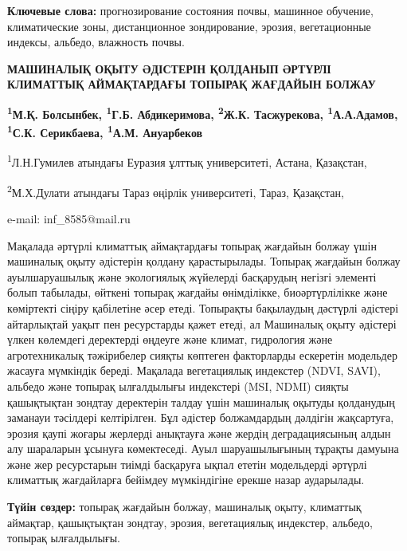 {\bfseries Ключевые слова:} прогнозирование состояния почвы, машинное
обучение, климатические зоны, дистанционное зондирование, эрозия,
вегетационные индексы, альбедо, влажность почвы.

\begin{articleheader}
{\bfseries МАШИНАЛЫҚ ОҚЫТУ ӘДІСТЕРІН ҚОЛДАНЫП ӘРТҮРЛІ КЛИМАТТЫҚ
АЙМАҚТАРДАҒЫ ТОПЫРАҚ ЖАҒДАЙЫН БОЛЖАУ}

{\bfseries
\textsuperscript{1}М.Қ. Болсынбек,
\textsuperscript{1}Г.Б. Абдикеримова,
\textsuperscript{2}Ж.К. Тасжурекова,
\textsuperscript{1}А.А.Адамов,
\textsuperscript{1}С.К. Серикбаева\textsuperscript{\envelope },
\textsuperscript{1}А.М. Ануарбеков
}
\end{articleheader}

\begin{affiliation}
\textsuperscript{1}Л.Н.Гумилев атындағы Еуразия ұлттық университеті, Астана, Қазақстан,

\textsuperscript{2}М.Х.Дулати атындағы Тараз өңірлік университеті, Тараз, Қазақстан,

e-mail: inf\_8585@mail.ru
\end{affiliation}

Мақалада әртүрлі климаттық аймақтардағы топырақ жағдайын болжау үшін
машиналық оқыту әдістерін қолдану қарастырылады. Топырақ жағдайын болжау
ауылшаруашылық және экологиялық жүйелерді басқарудың негізгі элементі
болып табылады, өйткені топырақ жағдайы өнімділікке, биоәртүрлілікке
және көміртекті сіңіру қабілетіне әсер етеді. Топырақты бақылаудың
дәстүрлі әдістері айтарлықтай уақыт пен ресурстарды қажет етеді, ал
Машиналық оқыту әдістері үлкен көлемдегі деректерді өңдеуге және климат,
гидрология және агротехникалық тәжірибелер сияқты көптеген факторларды
ескеретін модельдер жасауға мүмкіндік береді. Мақалада вегетациялық
индекстер (NDVI, SAVI), альбедо және топырақ ылғалдылығы индекстері
(MSI, NDMI) сияқты қашықтықтан зондтау деректерін талдау үшін машиналық
оқытуды қолданудың заманауи тәсілдері келтірілген. Бұл әдістер
болжамдардың дәлдігін жақсартуға, эрозия қаупі жоғары жерлерді анықтауға
және жердің деградациясының алдын алу шараларын ұсынуға көмектеседі.
Ауыл шаруашылығының тұрақты дамуына және жер ресурстарын тиімді
басқаруға ықпал ететін модельдерді әртүрлі климаттық жағдайларға
бейімдеу мүмкіндігіне ерекше назар аударылады.

{\bfseries Түйін сөздер:} топырақ жағдайын болжау, машиналық оқыту,
климаттық аймақтар, қашықтықтан зондтау, эрозия, вегетациялық индекстер,
альбедо, топырақ ылғалдылығы.

